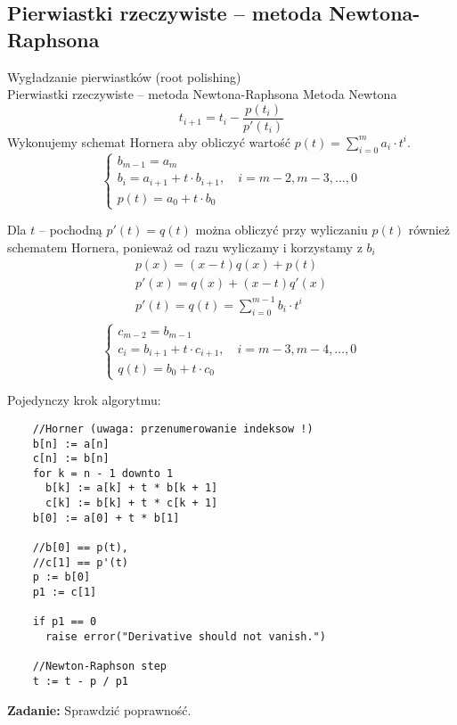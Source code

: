 \subsection{Pierwiastki rzeczywiste -- metoda Newtona-Raphsona}

\begin{frame}{Wygładzanie pierwiastków (root polishing) \\Pierwiastki rzeczywiste -- metoda Newtona-Raphsona}
Metoda Newtona
    $$t_{i+1}=t_{i}-\frac{p(t_i)}{p'(t_i)}$$
    Wykonujemy schemat Hornera aby obliczyć wartość $p(t)=\sum_{i=0}^m a_i\cdot t^i$.
    $$ \left \{ \begin{array}{l}
    b_{m-1} = a_m \\
    b_i = a_{i+1} + t \cdot b_{i+1}, \quad i = m - 2, m-3, \dots, 0 \\
    p(t) = a_{0} + t \cdot b_{0}
    \end{array} \right. $$
    \end{frame}
    \begin{frame}
     Dla $t$ -- pochodną $p'(t)=q(t)$ można obliczyć przy wyliczaniu $p(t)$ również schematem Hornera, ponieważ od razu wyliczamy i korzystamy z $b_i$
      \begin{gather*}
      p(x)= (x - t) q(x) + p(t)\\
      p'(x) = q(x) + (x - t) q'(x)\\
      p'(t) = q(t)=\sum_{i=0}^{m-1} b_i\cdot t^i\\
    \end{gather*} 
    $$ \left \{ \begin{array}{l}
    c_{m-2} = b_{m-1} \\
    c_i = b_{i+1} + t \cdot c_{i+1}, \quad i = m - 3, m-4, \dots, 0 \\
    q(t) = b_{0} + t \cdot c_{0}
    \end{array} \right. $$
\end{frame}

\begin{frame}[fragile]
  Pojedynczy krok algorytmu:
  \begin{lstlisting}
    //Horner (uwaga: przenumerowanie indeksow !)
    b[n] := a[n]
    c[n] := b[n]
    for k = n - 1 downto 1
      b[k] := a[k] + t * b[k + 1]
      c[k] := b[k] + t * c[k + 1]
    b[0] := a[0] + t * b[1]

    //b[0] == p(t),
    //c[1] == p'(t)
    p := b[0]
    p1 := c[1]

    if p1 == 0
      raise error("Derivative should not vanish.")

    //Newton-Raphson step
    t := t - p / p1
  \end{lstlisting}

  \textbf{Zadanie:} Sprawdzić poprawność.
\end{frame}
